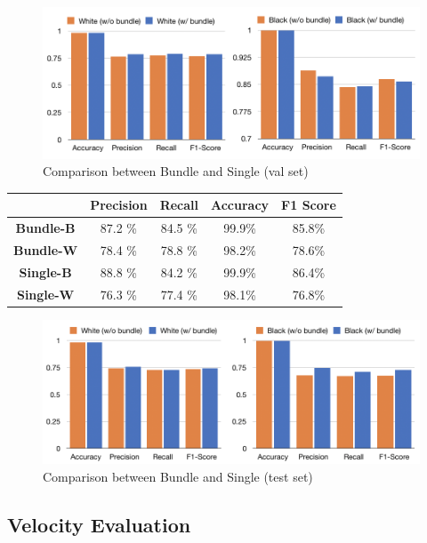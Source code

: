 \documentclass[10pt,twocolumn,letterpaper]{article}
\begin{document}
\begin{figure}[h!]
   \centering
   \includegraphics[width=\linewidth]{fig/18.png}
   \caption{Comparison between Bundle and Single (val set)}
\end{figure}

\begin{minipage}{\linewidth}
   \centering
\begin{tabular}{ccccc}
   \toprule
   & Precision &Recall&Accuracy& F1 Score\\
   \midrule
   \textbf{Bundle-B} &87.2 \%& 84.5 \%&99.9\%& 85.8\%\\
   \textbf{Bundle-W} &78.4 \%& 78.8 \%&98.2\%& 78.6\%\\
   \textbf{Single-B} &88.8 \%& 84.2 \%&99.9\%& 86.4\%\\
   \textbf{Single-W} &76.3 \%& 77.4 \%&98.1\%& 76.8\%\\
   \bottomrule
   \end{tabular}
    \label{tab:prevdataset}

\end{minipage}
\begin{figure}[h!]
   \centering
   \includegraphics[width=\linewidth]{fig/17.png}
   \caption{Comparison between Bundle and Single (test set)}
\end{figure}


\subsection{Velocity Evaluation}
\end{document}
